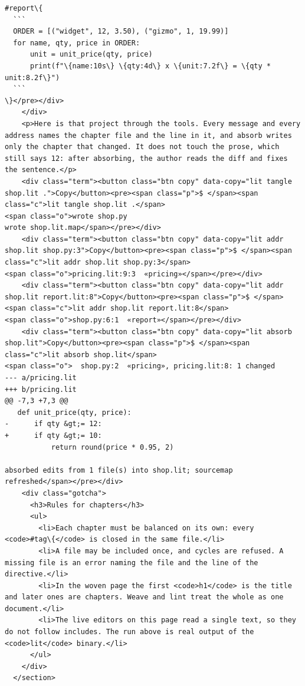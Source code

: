 \documentclass[10pt,a4paper]{article}
\begin{document}
\begin{Verbatim}
#report\{
  ```
  ORDER = [("widget", 12, 3.50), ("gizmo", 1, 19.99)]
  for name, qty, price in ORDER:
      unit = unit_price(qty, price)
      print(f"\{name:10s\} \{qty:4d\} x \{unit:7.2f\} = \{qty * unit:8.2f\}")
  ```
\}</pre></div>
    </div>
    <p>Here is that project through the tools. Every message and every address names the chapter file and the line in it, and absorb writes only the chapter that changed. It does not touch the prose, which still says 12: after absorbing, the author reads the diff and fixes the sentence.</p>
    <div class="term"><button class="btn copy" data-copy="lit tangle shop.lit .">Copy</button><pre><span class="p">$ </span><span class="c">lit tangle shop.lit .</span>
<span class="o">wrote shop.py
wrote shop.lit.map</span></pre></div>
    <div class="term"><button class="btn copy" data-copy="lit addr shop.lit shop.py:3">Copy</button><pre><span class="p">$ </span><span class="c">lit addr shop.lit shop.py:3</span>
<span class="o">pricing.lit:9:3  «pricing»</span></pre></div>
    <div class="term"><button class="btn copy" data-copy="lit addr shop.lit report.lit:8">Copy</button><pre><span class="p">$ </span><span class="c">lit addr shop.lit report.lit:8</span>
<span class="o">shop.py:6:1  «report»</span></pre></div>
    <div class="term"><button class="btn copy" data-copy="lit absorb shop.lit">Copy</button><pre><span class="p">$ </span><span class="c">lit absorb shop.lit</span>
<span class="o">  shop.py:2  «pricing», pricing.lit:8: 1 changed
--- a/pricing.lit
+++ b/pricing.lit
@@ -7,3 +7,3 @@
   def unit_price(qty, price):
-      if qty &gt;= 12:
+      if qty &gt;= 10:
           return round(price * 0.95, 2)

absorbed edits from 1 file(s) into shop.lit; sourcemap refreshed</span></pre></div>
    <div class="gotcha">
      <h3>Rules for chapters</h3>
      <ul>
        <li>Each chapter must be balanced on its own: every <code>#tag\{</code> is closed in the same file.</li>
        <li>A file may be included once, and cycles are refused. A missing file is an error naming the file and the line of the directive.</li>
        <li>In the woven page the first <code>h1</code> is the title and later ones are chapters. Weave and lint treat the whole as one document.</li>
        <li>The live editors on this page read a single text, so they do not follow includes. The run above is real output of the <code>lit</code> binary.</li>
      </ul>
    </div>
  </section>


\end{Verbatim}
\end{document}
